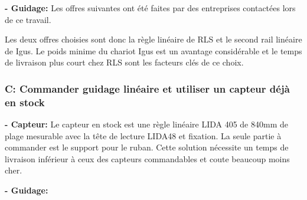 \textbf{ - Guidage:}
\newline
Les offres suivantes ont été faites par des entreprises contactées lors de ce travail.

\begin{table}[H]
    \centering
    \caption{Offres pour le guidage}
    \label{tab:OffreGuid1}
\end{table}

Les deux offres choisies sont donc la règle linéaire de RLS et le second rail linéaire de Igus. Le poids minime du chariot Igus est un avantage considérable
et le temps de livraison plus court chez RLS sont les facteurs clés de ce choix.

\subsubsection{C: Commander guidage linéaire et utiliser un capteur déjà en stock}
\textbf{ - Capteur:}
\newline
Le capteur en stock est une règle linéaire LIDA 405 de 840mm de plage mesurable avec la tête de lecture LIDA48 et fixation. La seule partie à commander
est le support pour le ruban. Cette solution nécessite un temps de livraison inférieur à ceux des capteurs commandables et coute beaucoup moins cher.

\textbf{ - Guidage:}
\newline

